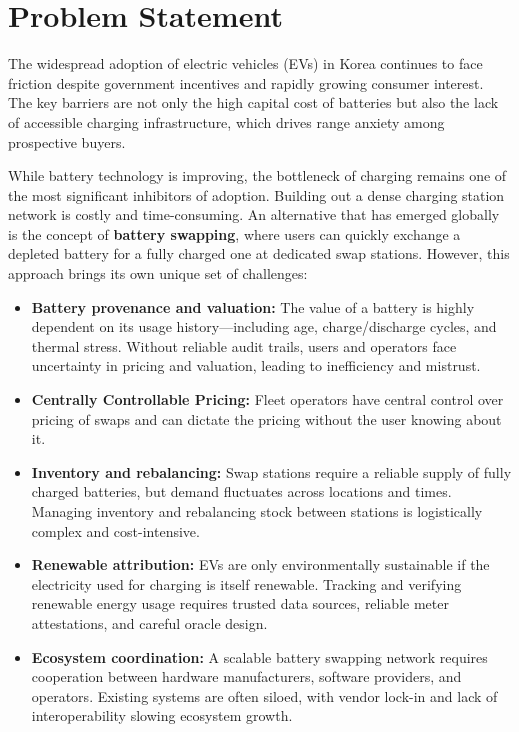 \documentclass[12pt,a4paper]{article}
\begin{document}
\section{Problem Statement}

The widespread adoption of electric vehicles (EVs) in Korea continues to face friction despite government incentives and rapidly growing consumer interest. The key barriers are not only the high capital cost of batteries but also the lack of accessible charging infrastructure, which drives range anxiety among prospective buyers. 

While battery technology is improving, the bottleneck of charging remains one of the most significant inhibitors of adoption. Building out a dense charging station network is costly and time-consuming. An alternative that has emerged globally is the concept of \textbf{battery swapping}, where users can quickly exchange a depleted battery for a fully charged one at dedicated swap stations. However, this approach brings its own unique set of challenges:

\begin{itemize}[leftmargin=1.5em]
    \item \textbf{Battery provenance and valuation:} The value of a battery is highly dependent on its usage history---including age, charge/discharge cycles, and thermal stress. Without reliable audit trails, users and operators face uncertainty in pricing and valuation, leading to inefficiency and mistrust.

    \item \textbf{Centrally Controllable Pricing:} Fleet operators have central control over pricing of swaps and can dictate the pricing without the user knowing about it.
    
    \item \textbf{Inventory and rebalancing:} Swap stations require a reliable supply of fully charged batteries, but demand fluctuates across locations and times. Managing inventory and rebalancing stock between stations is logistically complex and cost-intensive.
    
    \item \textbf{Renewable attribution:} EVs are only environmentally sustainable if the electricity used for charging is itself renewable. Tracking and verifying renewable energy usage requires trusted data sources, reliable meter attestations, and careful oracle design.
    
    \item \textbf{Ecosystem coordination:} A scalable battery swapping network requires cooperation between hardware manufacturers, software providers, and operators. Existing systems are often siloed, with vendor lock-in and lack of interoperability slowing ecosystem growth.
\end{itemize}
\end{document}
